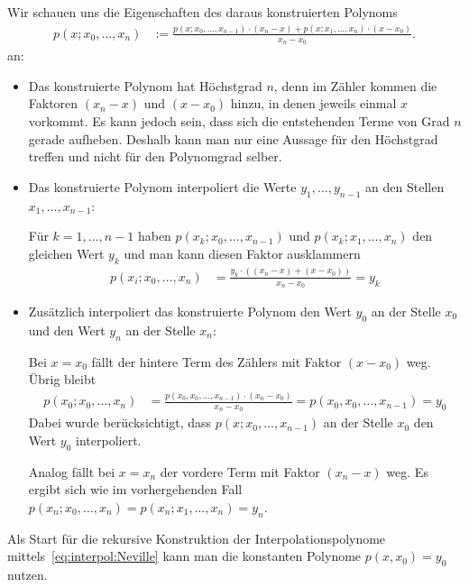 \documentclass{article}
\begin{document}
Wir schauen uns die Eigenschaften des daraus konstruierten Polynoms
\begin{align}
  p(x;x_0,\ldots,x_n) &:= \frac{p(x;x_0,\ldots,x_{n-1})\cdot(x_n-x) + p(x;x_1,\ldots,x_n)\cdot(x-x_0)}{x_n-x_0}.
                        \label{eq:interpol:Neville}
\end{align}
an:
\begin{itemize}
\item Das konstruierte Polynom hat Höchstgrad $n$, denn im Zähler
  kommen die Faktoren $(x_n-x)$ und $(x-x_0)$ hinzu, in denen jeweils
  einmal $x$ vorkommt. Es kann jedoch sein, dass sich die entstehenden
  Terme von Grad $n$ gerade aufheben. Deshalb kann man nur eine Aussage für
  den Höchstgrad treffen und nicht für den Polynomgrad selber.
\item Das konstruierte Polynom interpoliert die Werte $y_1,\ldots,y_{n-1}$ an den Stellen
  $x_1,\ldots,x_{n-1}$:
  
  Für $k=1,\ldots,n-1$ haben
  $p(x_k;x_0,\ldots,x_{n-1})$ und $p(x_k;x_1,\ldots,x_{n})$ den
  gleichen Wert $y_k$ und man kann diesen Faktor ausklammern
  \begin{align*}
    p(x_i;x_0,\ldots,x_n) &= \frac{y_k\cdot((x_n-x) + (x-x_0))}{x_n-x_0} = y_k
  \end{align*}
\item Zusätzlich interpoliert das konstruierte Polynom den Wert $y_0$
  an der Stelle $x_0$ und den Wert $y_n$ an der Stelle $x_n$:
  
  Bei $x=x_0$ fällt der hintere Term des Zählers mit Faktor $(x-x_0)$ weg. Übrig bleibt
  \begin{align*}
    p(x_0;x_0,\ldots,x_n)&=\frac{p(x_0,x_0,\ldots,x_{n-1})\cdot(x_n-x_0)}{x_n-x_0} = p(x_0,x_0,\ldots,x_{n-1}) = y_0
  \end{align*}
  Dabei wurde berücksichtigt, dass $p(x;x_0,\ldots,x_{n-1})$ an der
  Stelle $x_0$ den Wert $y_0$ interpoliert.
  
  Analog fällt bei $x=x_n$ der vordere Term mit Faktor $(x_n-x)$ weg.
  Es ergibt sich wie im vorhergehenden Fall $p(x_n;x_0,\ldots,x_n)=p(x_n;x_1,\ldots,x_n)=y_n$.
\end{itemize}

Als Start für die rekursive Konstruktion der Interpolationspolynome
mittels~\eqref{eq:interpol:Neville} kann man die konstanten Polynome $p(x,x_0)=y_0$ nutzen.
\end{document}
